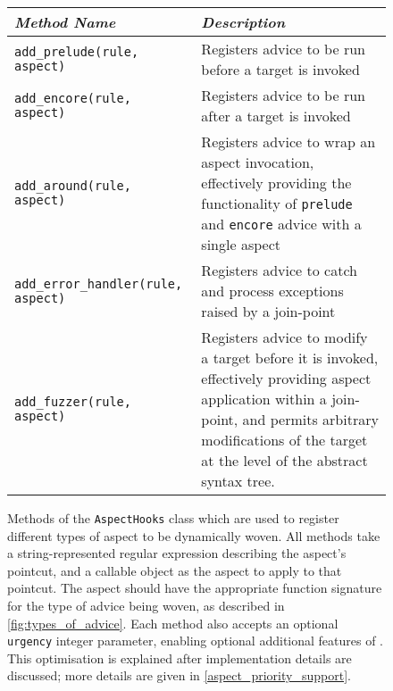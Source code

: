 \begin{figure}
    \centering
    \begin{tabular}{@{}lp{}@{}}
        \toprule
        \emph{Method Name} & \emph{Description}\\
        \midrule
        \lstinline[]$add_prelude(rule, aspect)$ &
            Registers advice to be run before a target is invoked\\
        \rule{0pt}{2em}\lstinline[]$add_encore(rule, aspect)$ &
            Registers advice to be run after a target is invoked\\
        \rule{0pt}{2em}\lstinline[]$add_around(rule, aspect)$ &
            Registers advice to wrap an aspect invocation, effectively providing
            the functionality of \lstinline[]$prelude$ and \lstinline[]$encore$
            advice with a single aspect\\
        \rule{0pt}{2em}\lstinline[]$add_error_handler(rule, aspect)$ &
            Registers advice to catch and process exceptions raised by a join-point\\
        \rule{0pt}{2em}\lstinline[]$add_fuzzer(rule, aspect)$ &
            Registers advice to modify a target before it is invoked,
            effectively providing aspect application within a join-point, and
            permits arbitrary modifications of the target at the level of the
            abstract syntax tree.\\
        \bottomrule
    \end{tabular}
    \caption{Methods of the \lstinline{AspectHooks} class which are used to
    register different types of aspect to be dynamically woven. All methods take
    a string-represented regular expression describing the aspect's pointcut,
    and a callable object as the aspect to apply to that pointcut. The aspect
    should have the appropriate function signature for the type of advice being
    woven, as described in \cref{fig:types_of_advice}. Each method also accepts an
    optional \lstinline{urgency} integer parameter, enabling optional additional
    features of \pdsf{}. This optimisation is explained after implementation
    details are discussed; more details are given in
    \cref{aspect_priority_support}.}
    \label{aspect_registration_methods}
\end{figure}

